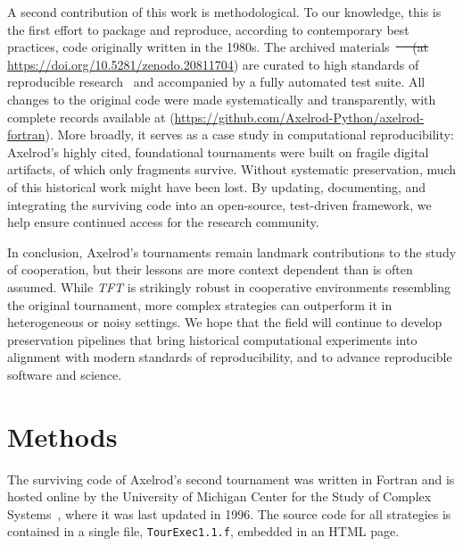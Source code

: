 \documentclass{article}
\newcommand{\TFT}{\emph{TFT}}
\providecommand{\DIFaddtex}[1]{{\protect\color{blue}\uwave{#1}}} %
\providecommand{\DIFdeltex}[1]{{\protect\color{red}\sout{#1}}}                      %
\providecommand{\DIFaddbegin}{} %
\providecommand{\DIFaddend}{} %
\providecommand{\DIFdelbegin}{} %
\providecommand{\DIFdelend}{} %
\providecommand{\DIFadd}[1]{\texorpdfstring{\DIFaddtex{#1}}{#1}} %
\providecommand{\DIFdel}[1]{\texorpdfstring{\DIFdeltex{#1}}{}} %
\newcommand{\DIFscaledelfig}{0.5}
\newlength{\DIFdelgraphicswidth} %
\newlength{\DIFdelgraphicsheight} %
\newcommand{\DIFaddincludegraphics}[2][]{{\color{blue}\fbox{\DIFOincludegraphics[#1]{#2}}}} %
\newcommand{\DIFdelincludegraphics}[2][]{%
\sbox{\DIFdelgraphicsbox}{\DIFOincludegraphics[#1]{#2}}%
\settoboxwidth{\DIFdelgraphicswidth}{\DIFdelgraphicsbox} %
\settoboxtotalheight{\DIFdelgraphicsheight}{\DIFdelgraphicsbox} %
\scalebox{\DIFscaledelfig}{%
\parbox[b]{\DIFdelgraphicswidth}{\usebox{\DIFdelgraphicsbox}\\[-\baselineskip] \rule{\DIFdelgraphicswidth}{0em}}\llap{\resizebox{\DIFdelgraphicswidth}{\DIFdelgraphicsheight}{%
\setlength{\unitlength}{\DIFdelgraphicswidth}%
\begin{picture}(1,1)%
\thicklines\linethickness{2pt} %
{\color[rgb]{1,0,0}\put(0,0){\framebox(1,1){}}}%
{\color[rgb]{1,0,0}\put(0,0){\line( 1,1){1}}}%
{\color[rgb]{1,0,0}\put(0,1){\line(1,-1){1}}}%
\end{picture}%
}\hspace*{3pt}}} %
} %
\DeclareRobustCommand{\DIFaddbegin}{\DIFOaddbegin \let\includegraphics\DIFaddincludegraphics} %
\DeclareRobustCommand{\DIFaddend}{\DIFOaddend \let\includegraphics\DIFOincludegraphics} %
\DeclareRobustCommand{\DIFdelbegin}{\DIFOdelbegin \let\includegraphics\DIFdelincludegraphics} %
\DeclareRobustCommand{\DIFdelend}{\DIFOaddend \let\includegraphics\DIFOincludegraphics} %
\begin{document}
\DIFaddend A second contribution of this work is methodological. To our knowledge, this is
the first effort to package and reproduce, according to contemporary best
practices, code originally written in the 1980s. The archived materials~\DIFdelbegin \DIFdel{\mbox{%
\cite{knight_2025_17250038} }\hskip0pt%
(at
}%
\DIFdelend \DIFaddbegin \DIFadd{\mbox{%
\cite{knight_2025_20811704} }\hskip0pt%
(at
}\url{https://doi.org/10.5281/zenodo.20811704}\DIFaddend )
are curated to high standards of reproducible research~\cite{wilson2014, sandve2013, wilson2017, stodden2018, turingway2022} and
accompanied by a fully automated test suite. All changes to the original code
were made systematically and transparently, with complete records available at
(\url{https://github.com/Axelrod-Python/axelrod-fortran}).
More broadly, it serves as a case study in computational reproducibility: Axelrod's highly cited,
foundational tournaments were built on fragile digital artifacts, of which only
fragments survive. Without systematic preservation, much of this
historical work might have been lost. By updating, documenting, and integrating the
surviving code into an open-source, test-driven framework, we help ensure
continued access for the research community.

In conclusion, Axelrod's tournaments remain landmark contributions to the study
of cooperation, but their lessons are more context dependent than is often assumed.
While \TFT{} is strikingly robust in cooperative
environments resembling the original tournament, more complex strategies can
outperform it in heterogeneous or noisy settings. We hope that the field will
continue to develop preservation pipelines that bring historical computational
experiments into alignment with modern standards of reproducibility, and to
advance reproducible software and science.

\section*{Methods}

The surviving code of Axelrod's second tournament was written in Fortran and is
hosted online by the University of Michigan Center for the Study of Complex
Systems~\cite{Axelrod1980bCode}, where it was last updated in 1996. The source
code for all strategies is contained in a single file, \texttt{TourExec1.1.f},
embedded in an HTML page.
\end{document}
